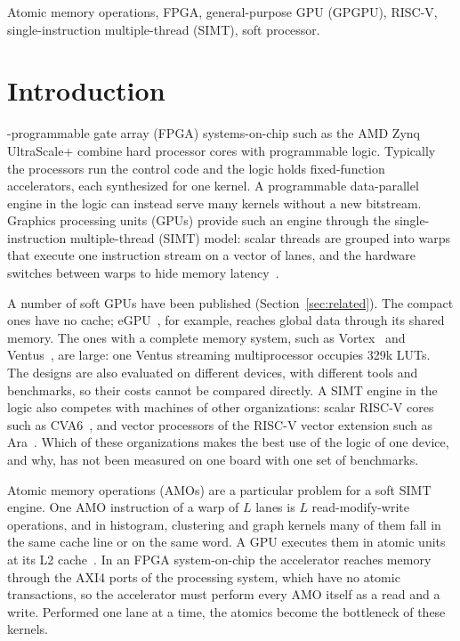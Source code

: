 \documentclass[journal]{IEEEtran}
\begin{document}
\begin{IEEEkeywords}
Atomic memory operations, FPGA, general-purpose GPU (GPGPU), RISC-V,
single-instruction multiple-thread (SIMT), soft processor.
\end{IEEEkeywords}

\section{Introduction}
-programmable gate array (FPGA) systems-on-chip such as the
AMD Zynq UltraScale+ combine hard processor cores with programmable logic.
Typically the processors run the control code and the logic holds fixed-function
accelerators, each synthesized for one kernel. A programmable data-parallel
engine in the logic can instead serve many kernels without a new bitstream.
Graphics processing units (GPUs) provide such an engine through the
single-instruction multiple-thread (SIMT) model: scalar threads are grouped into
warps that execute one instruction stream on a vector of lanes, and the hardware
switches between warps to hide memory latency~\cite{tesla,aamodt}.

A number of soft GPUs have been published (Section~\ref{sec:related}). The
compact ones have no cache; eGPU~\cite{egpu}, for example, reaches global data
through its shared memory. The ones with a complete memory system, such as
Vortex~\cite{vortex} and Ventus~\cite{ventus25}, are large: one Ventus streaming
multiprocessor occupies 329k LUTs. The designs are also evaluated on different
devices, with different tools and benchmarks, so their costs cannot be compared
directly. A SIMT engine in the logic also competes with machines of other
organizations: scalar RISC-V cores such as CVA6~\cite{cva6}, and vector processors of
the RISC-V vector extension such as Ara~\cite{ara,ara2}. Which of these organizations
makes the best use of the logic of one device, and why, has not been measured on one
board with one set of benchmarks.

Atomic memory operations (AMOs) are a particular problem for a soft SIMT engine.
One AMO instruction of a warp of $L$ lanes is $L$ read-modify-write operations,
and in histogram, clustering and graph kernels many of them fall in the same
cache line or on the same word. A GPU executes them in atomic units at its L2
cache~\cite{fermi}. In an FPGA system-on-chip the accelerator reaches memory
through the AXI4 ports of the processing system, which have no atomic
transactions, so the accelerator must perform every AMO itself as a read and a
write. Performed one lane at a time, the atomics become the bottleneck of these
kernels.
\end{document}

